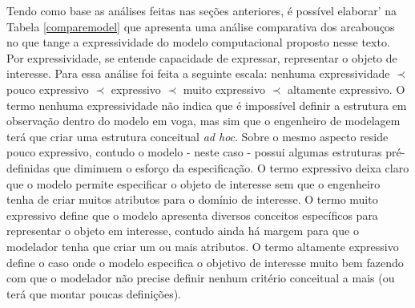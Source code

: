 Tendo como base as análises feitas nas seções anteriores, é possível elaborar' na Tabela \ref{comparemodel} que apresenta uma análise comparativa dos arcabouços no que tange a expressividade do modelo computacional proposto nesse texto. Por expressividade, se entende capacidade de expressar, representar o objeto de interesse. Para essa análise 
foi feita a seguinte escala: nenhuma expressividade $\prec$ pouco expressivo $\prec$ expressivo $\prec$ muito expressivo $\prec$ altamente expressivo. O termo nenhuma expressividade não indica que é impossível definir a estrutura em observação dentro do modelo em voga, mas sim que o engenheiro de modelagem terá que criar uma estrutura conceitual \textit{ad hoc}. Sobre o mesmo aspecto reside pouco expressivo, contudo o modelo - neste caso - possui algumas estruturas pré-definidas que diminuem o esforço da especificação. O termo expressivo deixa claro que o modelo permite especificar o objeto de interesse sem que o engenheiro tenha de criar muitos atributos para o domínio de interesse. O termo muito expressivo define que o modelo apresenta diversos conceitos específicos para representar o objeto em interesse, contudo ainda há margem para que o modelador tenha que criar um ou mais atributos. O termo altamente expressivo define o caso onde o modelo especifica o objetivo de interesse muito bem fazendo com que o modelador não precise definir nenhum critério conceitual a mais (ou terá que montar poucas definições).   

